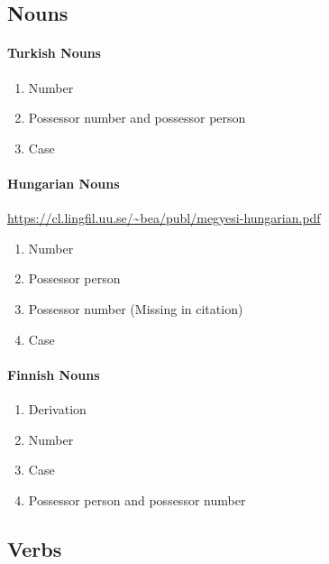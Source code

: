 \documentclass[11pt,letterpaper]{article}
\newcommand\becky[1]{{\color{blue}(#1)}}
\begin{document}
\subsection{Nouns}

\paragraph{Turkish Nouns}
\begin{enumerate}
    \item Number
    \item Possessor number and possessor person
    \item Case 
\end{enumerate}

\paragraph{Hungarian Nouns}
\url{https://cl.lingfil.uu.se/~bea/publ/megyesi-hungarian.pdf}
\begin{enumerate}
    \item Number
    \item Possessor person
    \item Possessor number \becky{Missing in citation}
    \item Case 
\end{enumerate}

\paragraph{Finnish Nouns}
\begin{enumerate}
    \item Derivation
    \item Number
    \item Case 
    \item Possessor person and possessor number
\end{enumerate}

\subsection{Verbs}
\end{document}
